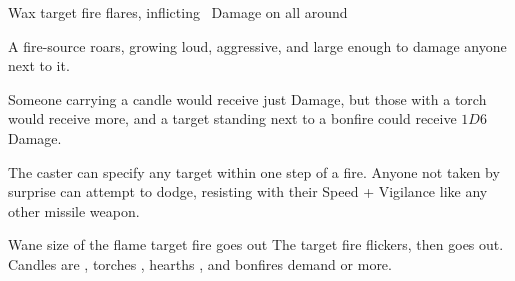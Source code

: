   {\mFire}%
  {Wax}%
  {}%
  {}%
  {target fire flares, inflicting \rollConv\ Damage on all around}%
  {
    A fire-source roars, growing loud, aggressive, and large enough to damage anyone next to it.

    Someone carrying a candle would receive just  Damage, but those with a torch would receive more, and a target standing next to a bonfire could receive $1D6$ Damage.

    The caster can specify any target within one step of a fire.
    Anyone not taken by surprise can attempt to dodge, resisting with their Speed + Vigilance like any other missile weapon.
  }

  {\mFire}%
  {Wane}%
  {}%
  {size of the flame}%
  {target fire goes out}%
  {
    The target fire flickers, then goes out.
    Candles are , torches , hearths , and bonfires demand  or more.
  }
